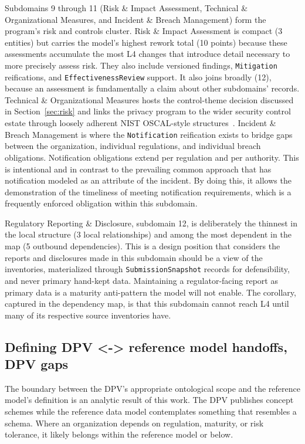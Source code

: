 \documentclass[10pt,letterpaper,twocolumn,twoside]{rho-class/rho}
\begin{document}
Subdomains 9 through 11 (Risk \& Impact Assessment, Technical \& Organizational Measures, and Incident \& Breach Management) form the program's risk and controls cluster. Risk \& Impact Assessment is compact (3 entities) but carries the model's highest rework total (10 points) because these assessments accumulate the most L4 changes that introduce detail necessary to more precisely assess risk. They also include versioned findings, \texttt{Mitigation} reifications, and \texttt{EffectivenessReview} support. It also joins broadly (12), because an assessment is fundamentally a claim about other subdomains' records. Technical \& Organizational Measures hosts the control-theme decision discussed in Section~\ref{sec:risk} and links the privacy program to the wider security control estate through loosely adherent NIST OSCAL-style structures~\cite{nistoscal}. Incident \& Breach Management is where the \texttt{Notification} reification exists to bridge gaps between the organization, individual regulations, and individual breach obligations. Notification obligations extend per regulation and per authority. This is intentional and in contrast to the prevailing common approach that has notification modeled as an attribute of the incident. By doing this, it allows the demonstration of the timeliness of meeting notification requirements, which is a frequently enforced obligation within this subdomain.

Regulatory Reporting \& Disclosure, subdomain 12, is deliberately the thinnest in the local structure (3 local relationships) and among the most dependent in the map (5 outbound dependencies). This is a design position that considers the reports and disclosures made in this subdomain should be a view of the inventories, materialized through \texttt{SubmissionSnapshot} records for defensibility, and never primary hand-kept data. Maintaining a regulator-facing report as primary data is a maturity anti-pattern the model will not enable. The corollary, captured in the dependency map, is that this subdomain cannot reach L4 until many of its respective source inventories have.

\subsection{Defining DPV <-> reference model handoffs, DPV gaps}\label{sec:boundary}

The boundary between the DPV's appropriate ontological scope and the reference model's definition is an analytic result of this work. The DPV publishes concept schemes while the reference data model contemplates something that resembles a schema. Where an organization depends on regulation, maturity, or risk tolerance, it likely belongs within the reference model or below.
\end{document}
